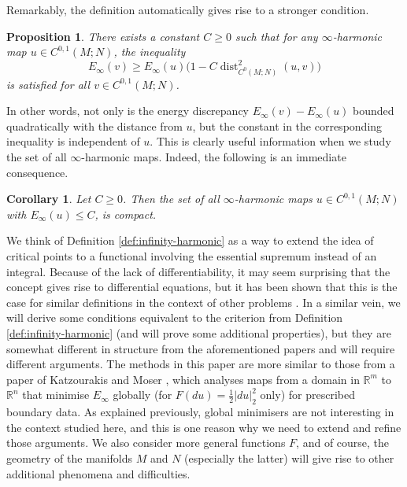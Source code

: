 \documentclass[a4paper]{article}
\newcommand{\R}{\mathbb{R}}
\DeclareMathOperator{\dist}{dist}
\newtheorem{proposition}[theorem]{Proposition}
\newtheorem{corollary}[theorem]{Corollary}
\theoremstyle{definition}
\theoremstyle{remark}
\begin{document}
Remarkably, the definition automatically gives rise to a stronger condition.

\begin{proposition} \label{prp:energy-discrepancy}
There exists a constant $C \ge 0$ such that for any $\infty$-harmonic map $u \in C^{0, 1}(M; N)$,
the inequality
\[
E_\infty(v) \ge E_\infty(u) \bigl(1 - C \dist_{C^0(M; N)}^2(u, v)\bigr)
\]
is satisfied for all $v \in C^{0, 1}(M; N)$.
\end{proposition}

In other words, not only is the energy discrepancy $E_\infty(v) - E_\infty(u)$ bounded quadratically
with the distance from $u$, but the constant in the corresponding inequality is independent of $u$.
This is clearly useful information when we study the set of all $\infty$-harmonic maps.
Indeed, the following is an immediate consequence.

\begin{corollary} \label{cor:compact}
Let $C \ge 0$. Then the set of all $\infty$-harmonic maps $u \in C^{0, 1}(M; N)$ with
$E_\infty(u) \le C$, is compact.
\end{corollary}

We think of Definition \ref{def:infinity-harmonic} as a way to extend the idea of critical points to a functional
involving the essential supremum instead of an integral. Because of the lack of differentiability,
it may seem surprising that the concept gives rise to differential
equations, but it has been shown that this is the case for similar definitions in the context of
other problems \cite{Moser:22, Katzourakis-Moser:23, Gallagher-Moser:23, Gallagher-Moser:24}.
In a similar vein, we will derive some conditions equivalent to the criterion
from Definition \ref{def:infinity-harmonic} (and will prove
some additional properties), but they are somewhat different in structure
from the aforementioned papers and will require
different arguments. The methods in this paper are more similar to those
from  a paper of Katzourakis and Moser \cite{Katzourakis-Moser:25},
which analyses maps from a domain in $\R^m$ to $\R^n$ that minimise
$E_\infty$ globally (for $F(du) = \frac{1}{2}|du|_2^2$ only) for prescribed boundary data.
As explained previously, global minimisers are not interesting in the
context studied here, and this is one reason why we need to extend and refine
those arguments. We also consider more general functions $F$, and of course,
the geometry of the manifolds $M$ and $N$ (especially the latter)
will give rise to other additional phenomena and difficulties.
\end{document}
